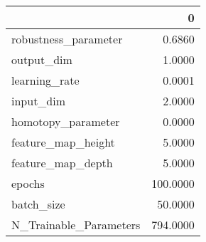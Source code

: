 \begin{tabular}{lr}
\toprule
{} &         0 \\
\midrule
robustness\_parameter   &    0.6860 \\
output\_dim             &    1.0000 \\
learning\_rate          &    0.0001 \\
input\_dim              &    2.0000 \\
homotopy\_parameter     &    0.0000 \\
feature\_map\_height     &    5.0000 \\
feature\_map\_depth      &    5.0000 \\
epochs                 &  100.0000 \\
batch\_size             &   50.0000 \\
N\_Trainable\_Parameters &  794.0000 \\
\bottomrule
\end{tabular}
